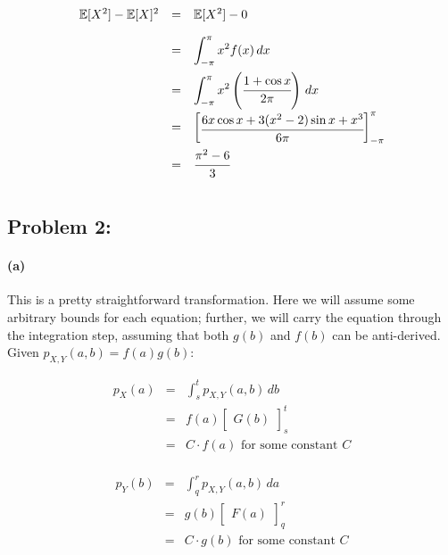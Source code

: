\documentclass[a4paper]{article}
\begin{document}
\begin{equation}
\begin{array}{rcl}
\mathbb{E}[X^2] - \mathbb{E}[X]^2 & = & \mathbb{E}[X^2] - 0 \\[.15in]
& = &  \displaystyle\int^{\pi}_{-\pi} x^2 f(x) \,dx \\[.15in]
& = &  \displaystyle\int^{\pi}_{-\pi} x^2 \left( \cfrac{1+ \cos{x}}{2\pi} \right) \,dx \\[.15in]
& = & \begin{bmatrix} \cfrac{6x \cos{x} + 3(x^2-2) \sin{x} + x^3}{6 \pi} \end{bmatrix}^{\pi}_{-\pi} \\[.15in]
& = & \cfrac{\pi^2 - 6}{3} \\[.15in]
\end{array}
\end{equation}

\subsection*{Problem 2:}

\paragraph{(a)} This is a pretty straightforward transformation. Here we will assume some arbitrary bounds for each equation; further, we will carry the equation through the integration step, assuming that both $g(b)$ and $f(b)$ can be anti-derived. Given $p_{X, Y}(a, b) = f(a)g(b)$:

\begin{equation}
\begin{array}{rcc}
p_{X}(a) & = & \displaystyle\int^{t}_{s} p_{X, Y}(a, b) \,db \\[.15in]
& = & f(a) \begin{bmatrix} G(b) \end{bmatrix}^{t}_{s}\\[.15in]
& = & C \cdot f(a) \mbox{ for some constant } C \\[.15in]
\end{array}
\end{equation}

\begin{equation}
\begin{array}{rcc}
p_{Y}(b) & = & \displaystyle\int^{r}_{q} p_{X, Y}(a, b) \,da \\[.15in]
& = & g(b) \begin{bmatrix} F(a) \end{bmatrix}^{r}_{q}\\[.15in]
& = & C \cdot g(b) \mbox{ for some constant } C \\[.15in]
\end{array}
\end{equation}
\end{document}
